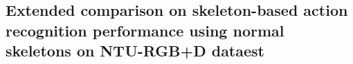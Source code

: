 \documentclass[runningheads]{llncs}
\begin{document}
\subsection{Extended comparison on skeleton-based action recognition performance using normal skeletons on NTU-RGB+D dataest}
\label{apx:5}
\begin{table*}[h]
\vspace{-6ex}
	\centering
		\caption{Performance comparison on NTU-RGB+D dataset and Kinetics-skeleton dataset. '-' indicates that the result were not reported. $^{*}$ indicates that model is trained by ourselves and figures in parentheses means reported accuracy. The boldface figures denote the highest performance for each experiment.}
\end{table*}
\end{document}
